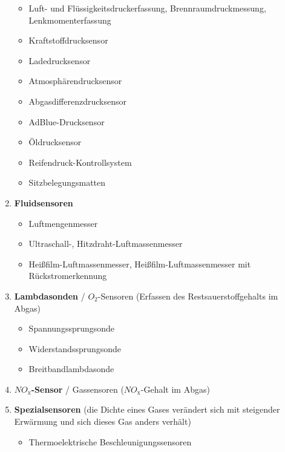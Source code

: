 \begin{enumerate}
  \begin{itemize}
  \item
    Luft- und Flüssigkeitsdruckerfassung, Brennraumdruckmessung,
    Lenkmomenterfassung
  \item
    Kraftstoffdrucksensor
  \item
    Ladedrucksensor
  \item
    Atmosphärendrucksensor
  \item
    Abgasdifferenzdrucksensor
  \item
    AdBlue-Drucksensor
  \item
    Öldrucksensor
  \item
    Reifendruck-Kontrollsystem
  \item
    Sitzbelegungsmatten
  \end{itemize}
\item
  \textbf{Fluidsensoren}

  \begin{itemize}
  \item
    Luftmengenmesser
  \item
    Ultraschall-, Hitzdraht-Luftmassenmesser
  \item
    Heißfilm-Luftmassenmesser, Heißfilm-Luftmassenmesser mit
    Rückstromerkennung
  \end{itemize}
\item
  \textbf{Lambdasonden} / $O_2$-Sensoren (Erfassen des
  Restsauerstoffgehalts im Abgas)

  \begin{itemize}
  \item
    Spannungssprungsonde
  \item
    Widerstandssprungsonde
  \item
    Breitbandlambdasonde
  \end{itemize}
\item
  \textbf{$NO_\text{x}$-Sensor} / Gassensoren ($NO_\text{x}$-Gehalt
  im Abgas)
\item
  \textbf{Spezialsensoren} (die Dichte eines Gases verändert sich mit
  steigender Erwärmung und sich dieses Gas anders verhält)

  \begin{itemize}
  \item
    Thermoelektrische Beschleunigungssensoren
  \end{itemize}
\end{enumerate}
